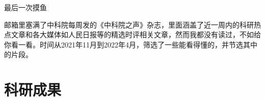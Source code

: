 \documentclass[10pt]{article}
\begin{document}
	\begin{center}
		\Large \heiti 最后一次摸鱼
	\end{center}
邮箱里塞满了中科院每周发的《中科院之声》杂志，里面涵盖了近一周内的科研热点文章和各大媒体如人民日报等的精选时评相关文章，然而我都没有读过，不如给你看一看。时间从2021年11月到2022年4月，筛选了一些能看得懂的，并节选其中的片段。
\section{科研成果}

\subsection{}
\end{document}
